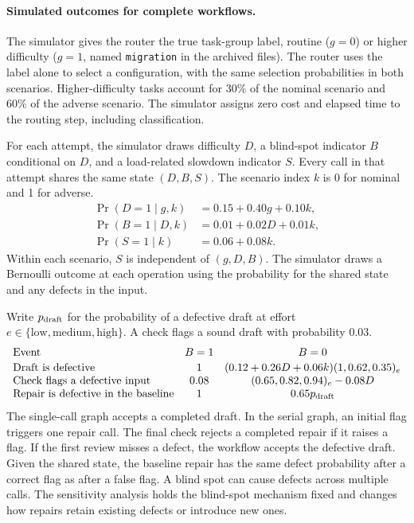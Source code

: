 \documentclass[11pt,reqno]{amsart}
\theoremstyle{definition}
\theoremstyle{remark}
\begin{document}
\paragraph{Simulated outcomes for complete workflows.}
The simulator gives the router the true task-group label, routine ($g=0$) or higher difficulty ($g=1$, named \texttt{migration} in the archived files). The router uses the label alone to select a configuration, with the same selection probabilities in both scenarios. Higher-difficulty tasks account for 30\% of the nominal scenario and 60\% of the adverse scenario.
The simulator assigns zero cost and elapsed time to the routing step, including classification.

For each attempt, the simulator draws difficulty $D$, a blind-spot indicator $B$ conditional on $D$, and a load-related slowdown indicator $S$. Every call in that attempt shares the same state $(D,B,S)$. The scenario index $k$ is 0 for nominal and 1 for adverse.
\[
\begin{aligned}
\Pr(D=1\mid g,k)&=0.15+0.40g+0.10k,\\
\Pr(B=1\mid D,k)&=0.01+0.02D+0.01k,\\
\Pr(S=1\mid k)&=0.06+0.08k.
\end{aligned}
\]
Within each scenario, $S$ is independent of $(g,D,B)$.
The simulator draws a Bernoulli outcome at each operation using the probability for the shared state and any defects in the input.

Write $p_{\rm draft}$ for the probability of a defective draft at effort $e\in\{\mathrm{low},\mathrm{medium},\mathrm{high}\}$.
A check flags a sound draft with probability $0.03$.
\[
\begin{array}{lcc}
\text{Event} & B=1 & B=0\\[2pt]
\text{Draft is defective} & 1 & (0.12+0.26D+0.06k)(1,0.62,0.35)_e\\
\text{Check flags a defective input} & 0.08 & (0.65,0.82,0.94)_e-0.08D\\
\text{Repair is defective in the baseline} & 1 & 0.65p_{\rm draft}
\end{array}
\]
The single-call graph accepts a completed draft.
In the serial graph, an initial flag triggers one repair call. The final check rejects a completed repair if it raises a flag.
If the first review misses a defect, the workflow accepts the defective draft. Given the shared state, the baseline repair has the same defect probability after a correct flag as after a false flag.
A blind spot can cause defects across multiple calls. The sensitivity analysis holds the blind-spot mechanism fixed and changes how repairs retain existing defects or introduce new ones.
\end{document}
